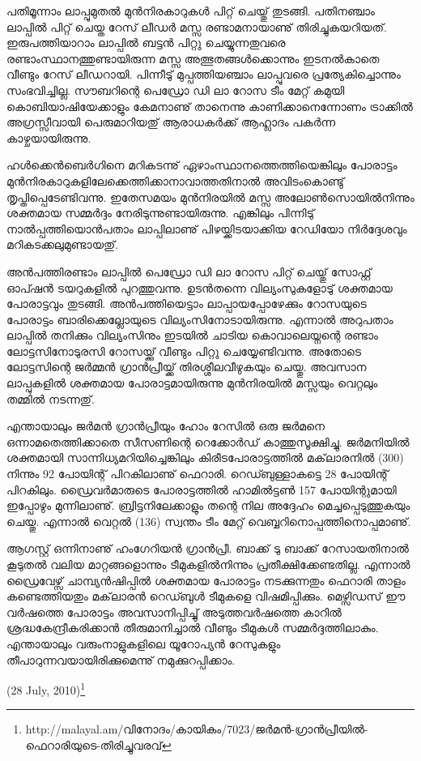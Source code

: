 പതിമൂന്നാം ലാപ്പുമുതല്‍ മുന്‍നിരകാറുകള്‍ പിറ്റ് ചെയ്തു് തുടങ്ങി. പതിനഞ്ചാം ലാപ്പില്‍ പിറ്റ് ചെയ്ത റേസ് ലീഡര്‍ മസ്സ 
രണ്ടാമനായാണു് തിരിച്ചുകയറിയത്. ഇരുപത്തിയാറാം ലാപ്പില്‍ ബട്ടന്‍ പിറ്റു ചെയ്യുന്നതുവരെ രണ്ടാംസ്ഥാനത്തുണ്ടായിരുന്ന 
മസ്സ അത്ഭുതങ്ങള്‍ക്കൊന്നും ഇടനല്‍കാതെ വീണ്ടും റേസ് ലീഡറായി. പിന്നീടു് മുപ്പത്തിയഞ്ചാം 
ലാപ്പുവരെ പ്രത്യേകിച്ചൊന്നും സംഭവിച്ചില്ല. സൗബറിന്റെ പെഡ്രോ ഡി ലാ റോസ ടീം മേറ്റ് കമുയി 
കൊബിയാഷിയേക്കാളും കേമനാണു് താനെന്നു കാണിക്കാനെന്നോണം ട്രാക്കില്‍ അഗ്രസ്സീവായി പെരുമാറിയതു് 
ആരാധകര്‍ക്ക് ആഹ്ലാദം പകര്‍ന്ന കാഴ്ചയായിരുന്നു.

ഹള്‍ക്കെന്‍ബെര്‍ഗിനെ മറികടന്നു് ഏഴാംസ്ഥാനത്തെത്തിയെങ്കിലും പോരാട്ടം 
മുന്‍നിരകാറുകളിലേക്കെത്തിക്കാനാവാത്തതിനാല്‍ അവിടംകൊണ്ടു് തൃപ്തിപ്പെടേണ്ടിവന്നു. ഇതേസമയം മുന്‍നിരയില്‍ 
മസ്സ അലോണ്‍സൊയില്‍നിന്നും ശക്തമായ സമ്മര്‍ദ്ദം നേരിടുന്നുണ്ടായിരുന്നു. എങ്കിലും പിന്നിടു് നാല്‍പ്പത്തിയൊന്‍പതാം 
ലാപ്പിലാണു് പിഴയ്ക്കിടയാക്കിയ റേഡിയോ നിര്‍ദ്ദേശവും മറികടക്കലുമുണ്ടായതു്.

അന്‍പത്തിരണ്ടാം ലാപ്പില്‍ പെഡ്രോ ഡി ലാ റോസ പിറ്റ് ചെയ്തു് സോഫ്റ്റ് ഓപ്ഷന്‍ ടയറുകളില്‍ പുറത്തുവന്നു. ഉടന്‍തന്നെ 
വില്യംസുകളോടു് ശക്തമായ പോരാട്ടവും തുടങ്ങി. അന്‍പത്തിയെട്ടാം ലാപ്പായപ്പോഴേക്കും റോസയുടെ പോരാട്ടം 
ബാരിക്കെല്ലോയുടെ വില്യംസിനോടായിരുന്നു. എന്നാല്‍ അറുപതാം ലാപ്പില്‍ തനിക്കും വില്യംസിനും ഇടയില്‍ ചാടിയ 
കൊവാലെയ്നന്റെ രണ്ടാം ലോട്ടസിനോടുരസി റോസയ്ക്കു് വീണ്ടും പിറ്റു ചെയ്യേണ്ടിവന്നു. അതോടെ ലോട്ടസിന്റെ ജര്‍മ്മന്‍ 
ഗ്രാന്‍പ്രീയ്ക്ക് തിരശ്ശീലവീഴുകയും ചെയ്തു. അവസാന ലാപ്പുകളില്‍ ശക്തമായ പോരാട്ടമായിരുന്നു മുന്‍നിരയില്‍ മസ്സയും 
വെറ്റലും തമ്മില്‍ നടന്നതു്.

എന്തായാലും ജര്‍മന്‍ ഗ്രാന്‍പ്രീയും ഹോം റേസില്‍ ഒരു ജര്‍മനെ ഒന്നാമതെത്തിക്കാതെ സീസണിന്റെ റെക്കോര്‍ഡ് കാത്തുസൂക്ഷിച്ചു. 
ജര്‍മനിയില്‍ ശക്തമായി സാന്നിധ്യമറിയിച്ചെങ്കിലും കിരീടപോരാട്ടത്തില്‍ മക്‌ലാരനില്‍ (300) നിന്നും 92 
പോയിന്റ് പിറകിലാണു് ഫെറാരി. റെഡ്ബുള്ളാകട്ടെ 28 പോയിന്റ് പിറകിലും. ഡ്രൈവര്‍മാരുടെ പോരാട്ടത്തില്‍ 
ഹാമില്‍ട്ടണ്‍ 157 പോയിന്റുമായി ഇപ്പോഴും മുന്നിലാണു്. ബ്രിട്ടനിലേക്കാളും തന്റെ നില അദ്ദേഹം മെച്ചപ്പെടുത്തുകയും 
ചെയ്തു. എന്നാല്‍ വെറ്റല്‍ (136) സ്വന്തം ടീം മേറ്റ് വെബ്ബറിനൊപ്പത്തിനൊപ്പമാണു്.

ആഗസ്റ്റ് ഒന്നിനാണു് ഹംഗേറിയന്‍ ഗ്രാന്‍പ്രീ. ബാക്ക് ടു ബാക്ക് റേസായതിനാല്‍ കൂടുതല്‍ വലിയ മാറ്റങ്ങളൊന്നും 
ടീമുകളില്‍നിന്നും പ്രതീക്ഷിക്കേണ്ടതില്ല. എന്നാല്‍ ഡ്രൈവേഴ്സ് ചാമ്പ്യന്‍ഷിപ്പില്‍ ശക്തമായ പോരാട്ടം നടക്കുന്നതും ഫെറാരി 
താളം കണ്ടെത്തിയതും മക്‌ലാരന്‍ റെഡ്ബുള്‍ ടീമുകളെ വിഷമിപ്പിക്കും. മെഴ്സിഡസ് ഈ വര്‍ഷത്തെ പോരാട്ടം 
അവസാനിപ്പിച്ചു് അടുത്തവര്‍ഷത്തെ കാറില്‍ ശ്രദ്ധകേന്ദ്രീകരിക്കാന്‍ തീരുമാനിച്ചാല്‍ വീണ്ടും ടീമുകള്‍ സമ്മര്‍ദ്ദത്തിലാകും.
എന്തായാലും വരുംനാളുകളിലെ യൂറോപ്യന്‍ റേസുകളും തീപാറുന്നവയായിരിക്കുമെന്നു് നമുക്കുറപ്പിക്കാം.

\begin{flushright}(28 July, 2010)\footnote{http://malayal.am/വിനോദം/കായികം/7023/ജര്‍മന്‍-ഗ്രാന്‍പ്രീയില്‍-ഫെറാരിയുടെ-തിരിച്ചുവരവ്}\end{flushright}

\newpage
